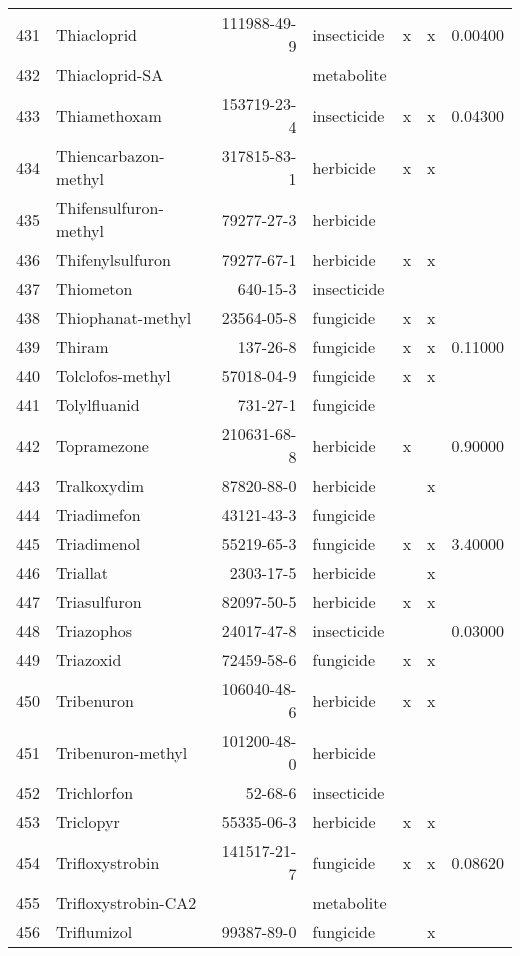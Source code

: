 \begin{longtable}{lp{3cm}rlp{1cm}p{1cm}p{1.5cm}}
  431 & Thiacloprid & 111988-49-9 & insecticide & x & x & 0.00400 \\ 
  432 & Thiacloprid-SA &  & metabolite &  &  &  \\ 
  433 & Thiamethoxam & 153719-23-4 & insecticide & x & x & 0.04300 \\ 
  434 & Thiencarbazon-methyl & 317815-83-1 & herbicide & x & x &  \\ 
  435 & Thifensulfuron-methyl & 79277-27-3 & herbicide &  &  &  \\ 
  436 & Thifenylsulfuron & 79277-67-1 & herbicide & x & x &  \\ 
  437 & Thiometon & 640-15-3 & insecticide &  &  &  \\ 
  438 & Thiophanat-methyl & 23564-05-8 & fungicide & x & x &  \\ 
  439 & Thiram & 137-26-8 & fungicide & x & x & 0.11000 \\ 
  440 & Tolclofos-methyl & 57018-04-9 & fungicide & x & x &  \\ 
  441 & Tolylfluanid & 731-27-1 & fungicide &  &  &  \\ 
  442 & Topramezone & 210631-68-8 & herbicide & x &  & 0.90000 \\ 
  443 & Tralkoxydim & 87820-88-0 & herbicide &  & x &  \\ 
  444 & Triadimefon & 43121-43-3 & fungicide &  &  &  \\ 
  445 & Triadimenol & 55219-65-3 & fungicide & x & x & 3.40000 \\ 
  446 & Triallat & 2303-17-5 & herbicide &  & x &  \\ 
  447 & Triasulfuron & 82097-50-5 & herbicide & x & x &  \\ 
  448 & Triazophos & 24017-47-8 & insecticide &  &  & 0.03000 \\ 
  449 & Triazoxid & 72459-58-6 & fungicide & x & x &  \\ 
  450 & Tribenuron & 106040-48-6 & herbicide & x & x &  \\ 
  451 & Tribenuron-methyl & 101200-48-0 & herbicide &  &  &  \\ 
  452 & Trichlorfon & 52-68-6 & insecticide &  &  &  \\ 
  453 & Triclopyr & 55335-06-3 & herbicide & x & x &  \\ 
  454 & Trifloxystrobin & 141517-21-7 & fungicide & x & x & 0.08620 \\ 
  455 & Trifloxystrobin-CA2 &  & metabolite &  &  &  \\ 
  456 & Triflumizol & 99387-89-0 & fungicide &  & x &  \\ 

\end{longtable}

